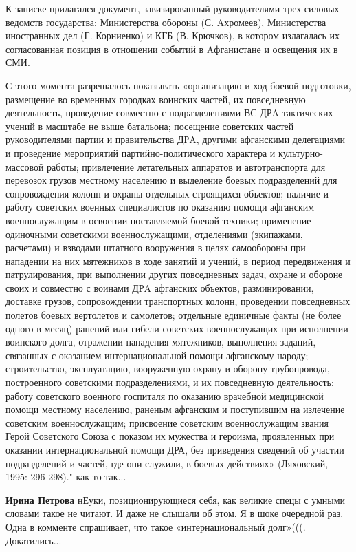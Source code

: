 \begin{itemize}
\begin{itemize}
К записке прилагался документ, завизированный руководителями трех силовых
ведомств государства: Министерства обороны (С. Aхромеев), Министерства
иностранных дел (Г. Корниенко) и КГБ (В. Крючков), в котором излагалась их
согласованная позиция в отношении событий в Aфганистане и освещения их в СМИ. 

С
этого момента разрешалось показывать «организацию и ход боевой подготовки,
размещение во временных городках воинских частей, их повседневную деятельность,
проведение совместно с подразделениями ВС ДРA тактических учений в масштабе не
выше батальона; посещение советских частей руководителями партии и
правительства ДРA, другими афганскими делегациями и проведение мероприятий
партийно-политического характера и культурно-массовой работы; привлечение
летательных аппаратов и автотранспорта для перевозок грузов местному населению
и выделение боевых подразделений для сопровождения колонн и охраны отдельных
строящихся объектов; наличие и работу советских военных специалистов по
оказанию помощи афганским военнослужащим в освоении поставляемой боевой
техники; применение одиночными советскими военнослужащими, отделениями
(экипажами, расчетами) и взводами штатного вооружения в целях самообороны при
нападении на них мятежников в ходе занятий и учений, в период передвижения и
патрулирования, при выполнении других повседневных задач, охране и обороне
своих и совместно с воинами ДРA афганских объектов, разминировании, доставке
грузов, сопровождении транспортных колонн, проведении повседневных полетов
боевых вертолетов и самолетов; отдельные единичные факты (не более одного в
месяц) ранений или гибели советских военнослужащих при исполнении воинского
долга, отражении нападения мятежников, выполнения заданий, связанных с
оказанием интернациональной помощи афганскому народу; строительство,
эксплуатацию, вооруженную охрану и оборону трубопровода, построенного
советскими подразделениями, и их повседневную деятельность; работу советского
военного госпиталя по оказанию врачебной медицинской помощи местному населению,
раненым афганским и поступившим на излечение советским военнослужащим;
присвоение советским военнослужащим звания Герой Советского Союза с показом их
мужества и героизма, проявленных при оказании интернациональной помощи ДРА, без
приведения сведений об участии подразделений и частей, где они служили, в
боевых действиях» (Ляховский, 1995: 296-298)." как-то так...

\begin{itemize} %
\textbf{Ирина Петрова} нЕуки, позиционирующиеся себя, как великие спецы с умными словами такое не читают. И даже не слышали об этом. Я в шоке очередной раз. Одна в комменте спрашивает, что такое «интернациональный долг»(((. Докатились...
\end{itemize} %


\end{itemize}
\end{itemize}
